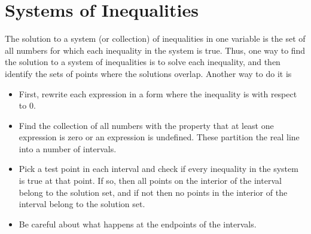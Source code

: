 \documentclass[11pt]{book}               %
\begin{document}
\newpage
\section{Systems of Inequalities}

The solution to a system (or collection) of inequalities in one variable is the set of all numbers for which each inequality in the system is true.  
Thus, one way to find the solution to a system of inequalities is to solve each inequality, and then identify the sets of points where the solutions overlap.
Another way to do it is
\begin{itemize}
\item First, rewrite each expression in a form where the inequality is with respect to 0.
\item  Find the collection of all numbers with the property that at least one expression is zero or an expression is undefined.  These partition the real line into a number of intervals.
\item Pick a test point in each interval and check if every inequality in the system is true at that point.  If so, then all points on the interior of the interval belong to the solution set, and if not then no points in the interior of the interval belong to the solution set.
\item Be careful about what happens at the endpoints of the intervals.
\end{itemize}
\end{document}
